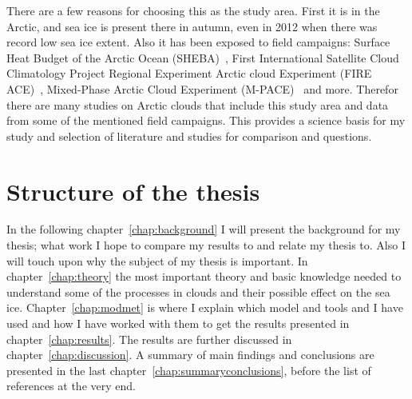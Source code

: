 There are a few reasons for choosing this as the study area. First it is in the Arctic, and sea ice is present there in autumn, even in 2012 when there was record low sea ice extent. Also it has been exposed to field campaigns: Surface Heat Budget of the Arctic Ocean (SHEBA)~\citep{Uttal2002}, First International Satellite Cloud Climatology Project Regional Experiment Arctic cloud Experiment (FIRE ACE)~\citep{Curry2000}, Mixed-Phase Arctic Cloud Experiment (M-PACE)~\citep{Verlinde2007} and more. Therefor there are many studies on Arctic clouds that include this study area and data from some of the mentioned field campaigns. This provides a science basis for my study and selection of literature and studies for comparison and questions.

\section{Structure of the thesis}
In the following chapter~\ref{chap:background} I will present the background for my thesis; what work I hope to compare my results to and relate my thesis to. Also I will touch upon why the subject of my thesis is important. In chapter~\ref{chap:theory} the most important theory and basic knowledge needed to understand some of the processes in clouds and their possible effect on the sea ice. Chapter~\ref{chap:modmet} is where I explain which model and tools and  I have used and how I have worked with them to get the results presented in chapter~\ref{chap:results}. The results are further discussed in chapter~\ref{chap:discussion}. A summary of main findings and conclusions are presented in the last chapter~\ref{chap:summaryconclusions}, before the list of references at the very end.


